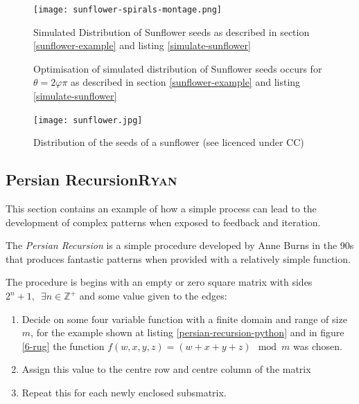 \documentclass[11pt]{article}
\begin{document}
\begin{figure}[htbp]
\centering
\texttt{[image: sunflower-spirals-montage.png]}
\caption{\label{simulate-sunflower-image}Simulated Distribution of Sunflower seeds as described in section \ref{sunflower-example} and listing \ref{simulate-sunflower}}
\end{figure}

\begin{figure}[htbp]
\centering

\caption{\label{simulate-sunflower-phi}Optimisation of simulated distribution of Sunflower seeds occurs for \(\theta =2 \varphi  \pi\) as described in section \ref{sunflower-example} and listing \ref{simulate-sunflower}}
\end{figure}


\begin{figure}[htbp]
\centering
\texttt{[image: sunflower.jpg]}
\caption{\label{sunflower}Distribution of the seeds of a sunflower (see \cite{simonbrassCCSearch2006} licenced under CC)}
\end{figure}

\subsection{Persian Recursion\hfill{}\textsc{Ryan}}
\label{sec:orgb66bda6}
This section contains an example of how a simple process can lead to the
development of complex patterns when exposed to feedback and iteration.

The \emph{Persian Recursion} is a simple procedure developed by Anne Burns in the 90s
\cite{burnsPersianRecursion1997} that produces fantastic patterns when provided
with a relatively simple function.

The procedure is begins with an empty or zero square matrix with sides \(2^{n}+1,
\enspace \exists n\in \mathbb{Z}^{+}\) and some value given to the edges:

\begin{enumerate}
\item Decide on some four variable function with a finite domain and range of size \(m\), for the example shown at listing \ref{persian-recursion-python} and in figure \ref{6-rug} the function \(f(w,x,y,z)=(w+x+y+z) \mod m\) was chosen.
\item Assign this value to the centre row and centre column of the matrix
\item Repeat this for each newly enclosed subsmatrix.
\end{enumerate}
\end{document}
